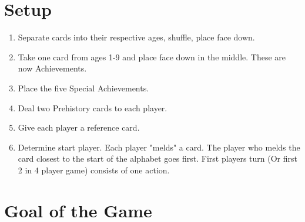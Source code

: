 \documentclass[12pt]{article}
\newenvironment{enumerateCustom}
{\begin{enumerate}
  \setlength{\itemsep}{1pt}
  \setlength{\parskip}{0pt}
  \setlength{\parsep}{0pt}}
{\end{enumerate}}
\begin{document}
\begin{mdframed}[style = customFrame]
\begin{multicols*}{2}

\section*{Setup}
\begin{enumerateCustom}
	\item Separate cards into their respective ages, shuffle, place face down.
	\item Take one card from ages 1-9 and place face down in the middle. These are now Achievements.
	\item Place the five Special Achievements.
	\item Deal two Prehistory cards to each player.
	\item Give each player a reference card.
	\item Determine start player. Each player "melds" a card. The player who melds the card closest to the start of the alphabet goes first. First players turn (Or first 2 in 4 player game) consists of one action.
\end{enumerateCustom}
\section*{Goal of the Game}

\end{multicols*}
\end{mdframed}
\end{document}
